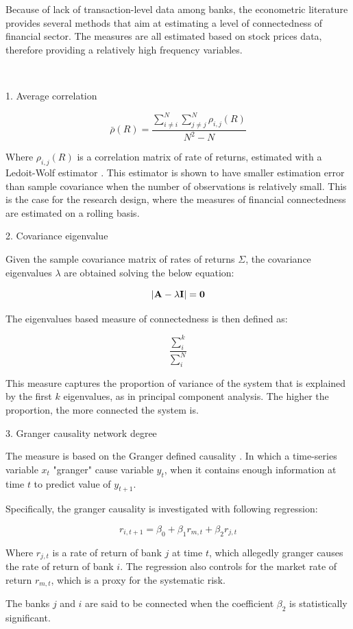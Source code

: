 \documentclass{article}
\begin{document}
Because of lack of transaction-level data among banks, the econometric literature provides several methods that aim at estimating a level of connectedness of financial sector. The measures are all estimated based on stock prices data, therefore providing a relatively high frequency variables. 

\

1. Average correlation 

\[\bar{\rho}(R) = \frac{\sum_{i \neq i}^{N} \sum_{j \neq j}^{N} \rho_{i,j}(R)}{N^2-N}\]

Where $\rho_{i,j}(R)$ is a correlation matrix of rate of returns, estimated with a Ledoit-Wolf estimator \citet{ledoit}. This estimator is shown to have smaller estimation error than sample covariance when the number of observations is relatively small. This is the case for the research design, where the measures of financial connectedness are estimated on a rolling basis.


2. Covariance eigenvalue 

Given the sample covariance matrix of rates of returns $\Sigma$, the covariance eigenvalues $\lambda$ are obtained solving the below equation:

\[|\bf{A} - \lambda \bf{I}| = 0\]

The eigenvalues based measure of connectedness is then defined as:

\[\frac{\sum_{i}^{k}}{\sum_{i}^{N}}\]

This measure captures the proportion of variance of the system that is explained by the first $k$ eigenvalues, as in principal component analysis. The higher the proportion, the more connected the system is.

3. Granger causality network degree

The measure is based on the Granger defined causality \citet{granger}. In which a time-series variable $x_t$ "granger" cause variable $y_t$, when it contains enough information at time $t$ to predict value of $y_{t+1}$. 

Specifically, the granger causality is investigated with following regression:

\[r_{i,t+1} = \beta_0 + \beta_1 r_{m, t} + \beta_2 r_{j, t}\]

Where $r_{j, t}$ is a rate of return of bank $j$ at time $t$, which allegedly granger causes the rate of return of bank $i$. The regression also controls for the market rate of return $r_{m, t}$, which is a proxy for the systematic risk.

The banks $j$ and $i$ are said to be connected when the coefficient $\beta_2$ is statistically significant. 
\end{document}
